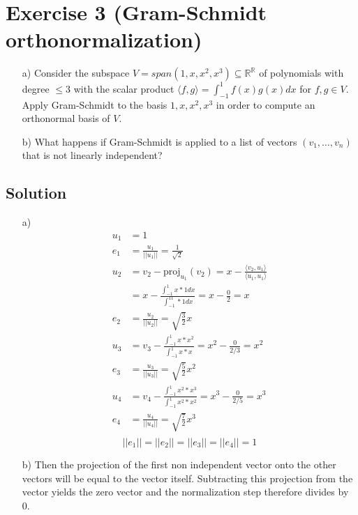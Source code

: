 \documentclass[10pt]{article}
\numberwithin{equation}{section}
\newcommand{\gramint}{\int_{-1}^1}
\begin{document}
\section*{Exercise 3 (Gram-Schmidt orthonormalization)}
\begin{enumerate}
\item[a)]{
    Consider the subspace $V = span(1, x, x^2 , x^3) \subseteq \mathbb{R}^{\mathbb{R}}$ of polynomials with degree $\leq 3$ with the scalar product $\langle f, g\rangle = \int_{-1}^1 f(x)g(x)dx$ for $f, g \in V$. Apply Gram-Schmidt to the basis $1, x, x^2 , x^3$ in order to compute an orthonormal basis of $V$.
  }
\item[b)]{
    What happens if Gram-Schmidt is applied to a list of vectors $(v_1, \dots, v_n)$ that is not linearly independent?
  }
\end{enumerate}

\subsection*{Solution}
\begin{enumerate}
\item[a)]{
    \begin{align*}
      u_1 &= 1\\
      e_1 &= \frac{u_1}{||u_1||} = \frac{1}{\sqrt{2}}\\
      u_2 &= v_2 - \text{proj}_{u_1} (v_2) = x - \frac{\langle v_2, u_1\rangle}{\langle u_1, u_1\rangle}\\
          &= x - \frac{\gramint x*1dx}{\gramint 1*1dx} = x - \frac{0}{2} = x\\
      e_2 &= \frac{u_2}{||u_2||} = \sqrt{\frac{3}{2}}x\\
      u_3 &= v_3 - \frac{\gramint x*x^2}{\gramint x*x} = x^2 - \frac{0}{2/3} = x^2\\
      e_3 &= \frac{u_3}{||u_3||} = \sqrt{\frac{5}{2}}x^2\\
      u_4 &= v_4 - \frac{\gramint x^2*x^3}{\gramint x^2*x^2} = x^3 - \frac{0}{2/5} = x^3\\
      e_4 &= \frac{u_4}{||u_4||} = \sqrt{\frac{7}{2}}x^3\\
    \end{align*}
    $$||e_1|| = ||e_2|| = ||e_3|| = ||e_4|| = 1$$
  }
\item[b)]{
    Then the projection of the first non independent vector onto the other vectors will be equal to the vector itself. Subtracting this projection from the vector yields the zero vector and the normalization step therefore divides by 0.
  }
\end{enumerate}
\end{document}
